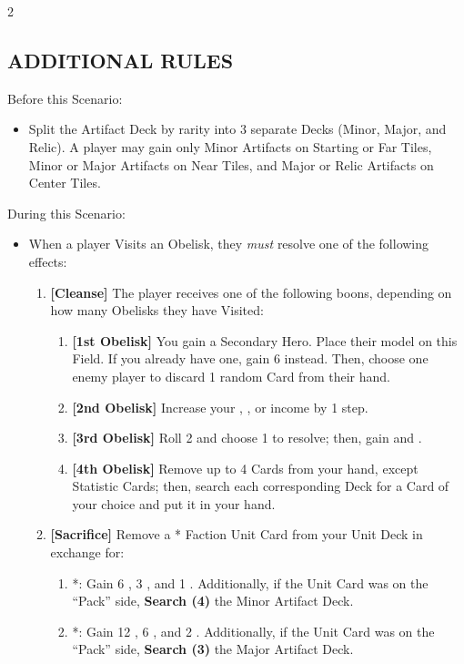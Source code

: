 \begin{multicols*}{2}
\subsection*{\MakeUppercase{Additional Rules}}
Before this Scenario:

\begin{itemize}
  \item Split the Artifact Deck by rarity into 3 separate Decks (Minor, Major, and Relic). A player may gain only Minor Artifacts on Starting or Far Tiles, Minor or Major Artifacts on Near Tiles, and Major or Relic Artifacts on Center Tiles.
\end{itemize}

During this Scenario:

\begin{itemize}
  \item When a player Visits an Obelisk, they \textit{must} resolve one of the following effects:
  \begin{enumerate}[leftmargin=15pt]
    \item \textbf{[Cleanse]} The player receives one of the following boons, depending on how many Obelisks they have Visited:
    \begin{enumerate}
      \item \textbf{[1st Obelisk]} You gain a Secondary Hero. Place their model on this Field. If you already have one, gain 6  instead. Then, choose one enemy player to discard 1 random Card from their hand.
      \item \textbf{[2nd Obelisk]} Increase your , , or  income by 1 step.
      \item \textbf{[3rd Obelisk]} Roll 2  and choose 1 to resolve; then, gain  and .
      \item \textbf{[4th Obelisk]} Remove up to 4 Cards from your hand, except Statistic Cards; then, search each corresponding Deck for a Card of your choice and put it in your hand.
    \end{enumerate}
    \item \textbf{[Sacrifice]} Remove a * Faction Unit Card from your Unit Deck in exchange for:
    \begin{enumerate}
      \item *: Gain 6 , 3 , and 1 . Additionally, if the Unit Card was on the ``Pack'' side, \textbf{Search (4)} the Minor Artifact Deck.
      \item *: Gain 12 , 6 , and 2 . Additionally, if the Unit Card was on the ``Pack'' side, \textbf{Search (3)} the Major Artifact Deck.

\end{enumerate}
\end{enumerate}
\end{itemize}
\end{multicols*}
